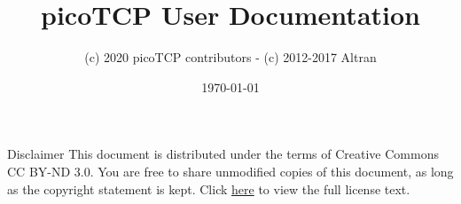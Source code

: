 %






\usepackage{longtable}


\usepackage[compact]{titlesec}

\usepackage{enumitem}

\usepackage{hyperref}
\setcounter{tocdepth}{1}




\title{picoTCP User Documentation}
\author{(c) 2020 picoTCP contributors - (c) 2012-2017 Altran}
\maketitle
\date{\today}
\maketitle

\thispagestyle{empty}

Disclaimer
This document is distributed under the terms of Creative Commons CC BY-ND 3.0.
You are free to share unmodified copies of this document, as long as the copyright
statement is kept. Click \href{http://creativecommons.org/licenses/by-nd/3.0/} {here} to view the full license text.


